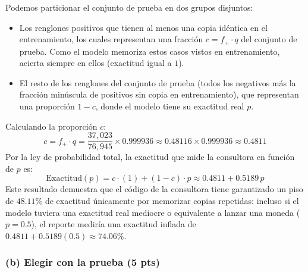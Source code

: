 \documentclass[11pt, letterpaper]{article}
\begin{document}
\begin{enumerate}[label=\textbf{\arabic*.}]
    Podemos particionar el conjunto de prueba en dos grupos disjuntos:
    \begin{itemize}
        \item Los renglones positivos que tienen al menos una copia idéntica en el entrenamiento, los cuales representan una fracción $c = f_+ \cdot q$ del conjunto de prueba. Como el modelo memoriza estos casos vistos en entrenamiento, acierta siempre en ellos (exactitud igual a $1$).
        \item El resto de los renglones del conjunto de prueba (todos los negativos más la fracción minúscula de positivos sin copia en entrenamiento), que representan una proporción $1 - c$, donde el modelo tiene su exactitud real $p$.
    \end{itemize}
    Calculando la proporción $c$:
    \[
        c = f_+ \cdot q = \frac{37{,}023}{76{,}945} \times 0.999936 \approx 0.48116 \times 0.999936 \approx 0.4811
    \]
    Por la ley de probabilidad total, la exactitud que mide la consultora en función de $p$ es:
    \[
        \text{Exactitud}(p) = c \cdot (1) + (1 - c) \cdot p \approx 0.4811 + 0.5189\,p
    \]
    Este resultado demuestra que el código de la consultora tiene garantizado un piso de $48.11\%$ de exactitud únicamente por memorizar copias repetidas: incluso si el modelo tuviera una exactitud real mediocre o equivalente a lanzar una moneda ($p = 0.5$), el reporte mediría una exactitud inflada de $0.4811 + 0.5189(0.5) \approx 74.06\%$.
\end{enumerate}

\subsubsection*{(b) Elegir con la prueba (5 pts)}
\end{document}
